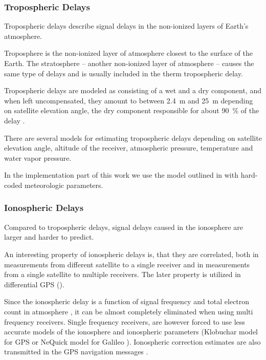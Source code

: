 \subsubsection{Tropospheric Delays}
Tropospheric delays describe signal delays in the non-ionized layers of Earth's atmosphere.

Troposphere is the non-ionized layer of atmosphere closest to the surface of the Earth.
The stratosphere -- another non-ionized layer of atmosphere -- causes the same
type of delays and is usually included in the therm tropospheric delay.

Tropospheric delays are modeled as consisting of a wet and a dry component,
and when left uncompensated, they amount to between \SI{2.4}{\meter} and \SI{25}{\meter}
depending on satellite elevation angle, the dry component
responsible for about \SI{90}{\percent} of the delay \cite{kaplan06}.

There are several models for estimating tropospheric delays depending on satellite
elevation angle, altitude of the receiver, atmospheric pressure, temperature and
water vapor pressure.

In the implementation part of this work we use the model outlined in \cite{navipedia-tropospheric}
with hard-coded meteorologic parameters.

\subsubsection{Ionospheric Delays}

Compared to tropospheric delays, signal delays caused in the ionosphere are larger and
harder to predict.

An interesting property of ionospheric delays is, that they are correlated,
both in measurements from different satellite to a single receiver and in measurements
from a single satellite to multiple receivers.
The later property is utilized in differential GPS ().

Since the ionospheric delay is a function of signal frequency and total electron
count in atmosphere \cite{kaplan06}, it can be almost completely
eliminated when using multi frequency receivers.
Single frequency receivers, are however forced to use less accurate
models of the ionosphere and ionospheric parameters (Klobuchar model for GPS
\cite{navipedia-klobuchar} or NeQuick model for Galileo \cite{navipedia-nequick}).
Ionospheric correction estimates are also transmitted in the GPS navigation
messages \cite{fyfe92}.

